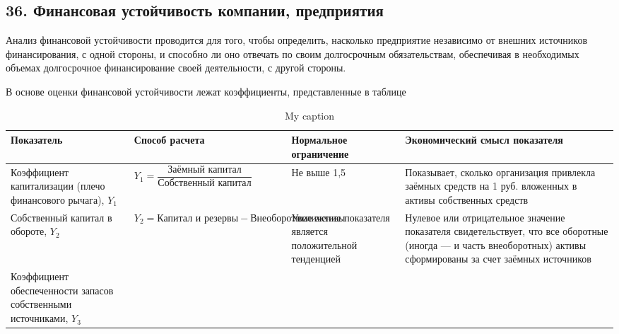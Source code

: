 \subsection*{36. Финансовая устойчивость компании, предприятия}

Анализ финансовой устойчивости проводится для того, чтобы определить, насколько предприятие независимо от внешних источников финансирования, с одной стороны, и способно ли оно отвечать по своим долгосрочным обязательствам, обеспечивая в необходимых объемах долгосрочное финансирование своей деятельности, с другой стороны.

В основе оценки финансовой устойчивости лежат коэффициенты, представленные в таблице

\begin{table}[!ht]
	\small
	\caption{My caption}
	\label{my-label}
	\setlength{\extrarowheight}{1mm}
	\begin{tabularx}{\textwidth}{|p{3cm}|K{4cm}|K{3cm}|K{4cm}|}
		\hline
		Показатель                                & Способ расчета                                & Нормальное ограничение             & Экономический смысл показателя                                                                                                          \\ \hline
		Коэффициент капитализации (плечо финансового рычага), $Y_1$        & $Y_1 = \dfrac{\text{Заёмный капитал}}{\text{Собственный капитал}}$ & Не выше 1,5                                             & Показывает, сколько организация привлекла заёмных средств на 1 руб. вложенных в активы собственных средств                                                        \\ \hline
		Собственный капитал в обороте, $Y_2$                               & $Y_2 = \text{Капитал и резервы} - \text{Внеоборотные активы}$      & Увеличение показателя является положительной тенденцией & Нулевое или отрицательное значение показателя свидетельствует, что все оборотные (иногда --- и часть внеоборотных) активы сформированы за счет заёмных источников \\ \hline
		Коэффициент обеспеченности запасов собственными источниками, $Y_3$ &                                                                    &                                                         &                                                                                                                                                                   \\ \hline

\end{tabularx}
\end{table}
